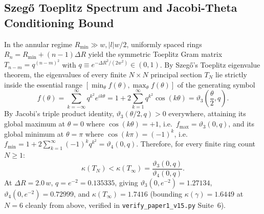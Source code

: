 \documentclass[10pt,letterpaper]{article}
\newcommand{\abs}[1]{\lvert #1 \rvert}
\numberwithin{equation}{section}
\begin{document}
\subsection{Szeg\H{o} Toeplitz Spectrum and Jacobi-Theta Conditioning Bound}
In the annular regime $R_{\min} \gg w, \abs{l}w/2$, uniformly spaced rings $R_n = R_{\min} + (n-1)\Delta R$ yield the symmetric Toeplitz Gram matrix $T_{n-m} = q^{(n-m)^2}$ with $q \equiv e^{-\Delta R^2/(2w^2)} \in (0,1)$. By Szeg\H{o}'s Toeplitz eigenvalue theorem, the eigenvalues of every finite $N\times N$ principal section $T_N$ lie strictly inside the essential range $[\min_\theta f(\theta), \max_\theta f(\theta)]$ of the generating symbol
\begin{equation}
  f(\theta) = \sum_{k=-\infty}^{\infty} q^{k^2} e^{ik\theta} = 1 + 2\sum_{k=1}^\infty q^{k^2}\cos(k\theta) = \vartheta_3\!\left(\frac{\theta}{2}, q\right).
\end{equation}
By Jacobi's triple product identity, $\vartheta_3(\theta/2, q) > 0$ everywhere, attaining its global maximum at $\theta = 0$ where $\cos(k\theta) = +1$, i.e.\ $f_{\max} = \vartheta_3(0,q)$, and its global minimum at $\theta = \pi$ where $\cos(k\pi) = (-1)^k$, i.e.\ $f_{\min} = 1 + 2\sum_{k=1}^\infty (-1)^k q^{k^2} = \vartheta_4(0,q)$. Therefore, for every finite ring count $N \ge 1$:
\begin{equation}
  \kappa(T_N) < \kappa(T_\infty) = \frac{\vartheta_3(0,q)}{\vartheta_4(0,q)}.
\end{equation}
At $\Delta R = 2.0\,w$, $q = e^{-2} = 0.135335$, giving $\vartheta_3(0,e^{-2}) = 1.27134$, $\vartheta_4(0,e^{-2}) = 0.72999$, and $\kappa(T_\infty) = \mathbf{1.7416}$ (bounding $\kappa(\gamma) = 1.6449$ at $N=6$ cleanly from above, verified in \texttt{verify\_paper1\_v15.py} Suite~6).
\end{document}
